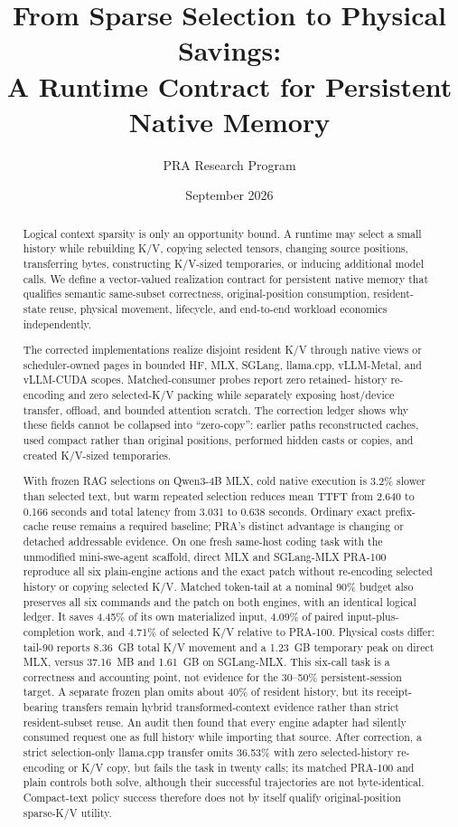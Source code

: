 \documentclass[11pt]{article}
\title{From Sparse Selection to Physical Savings:\\
 A Runtime Contract for Persistent Native Memory}
\author{PRA Research Program}
\date{September 2026}
\begin{document}
\maketitle

\begin{abstract}
Logical context sparsity is only an opportunity bound.  A runtime may select a
small history while rebuilding K/V, copying selected tensors, changing source
positions, transferring bytes, constructing K/V-sized temporaries, or inducing
additional model calls.  We define a vector-valued realization contract for
persistent native memory that qualifies semantic same-subset correctness,
original-position consumption, resident-state reuse, physical movement,
lifecycle, and end-to-end workload economics independently.

The corrected implementations realize disjoint resident K/V through native
views or scheduler-owned pages in bounded HF, MLX, SGLang, llama.cpp,
vLLM-Metal, and vLLM-CUDA scopes.  Matched-consumer probes report zero retained-
history re-encoding and zero selected-K/V packing while separately exposing
host/device transfer, offload, and bounded attention scratch.  The correction
ledger shows why these fields cannot be collapsed into ``zero-copy'': earlier
paths reconstructed caches, used compact rather than original positions,
performed hidden casts or copies, and created K/V-sized temporaries.

With frozen RAG selections on Qwen3-4B MLX, cold native execution is 3.2\%
slower than selected text, but warm repeated selection reduces mean TTFT from
2.640 to 0.166 seconds and total latency from 3.031 to 0.638 seconds.  Ordinary
exact prefix-cache reuse remains a required baseline; PRA's distinct advantage
is changing or detached addressable evidence.  On one fresh same-host coding
task with the unmodified mini-swe-agent scaffold, direct MLX and SGLang-MLX
PRA-100 reproduce all six plain-engine actions and the exact patch without
re-encoding selected history or copying selected K/V.  Matched token-tail at a
nominal 90\% budget also preserves all six commands and the patch on both
engines, with an identical logical ledger.  It saves 4.45\%
of its own materialized input, 4.09\% of paired input-plus-completion work,
and 4.71\% of selected K/V relative to PRA-100.  Physical costs differ:
tail-90 reports 8.36~GB total K/V movement and a 1.23~GB temporary peak on
direct MLX, versus 37.16~MB and 1.61~GB on SGLang-MLX.  This six-call task is a
correctness and accounting point, not evidence
for the 30--50\% persistent-session target.  A separate
frozen plan omits about 40\% of resident
history, but its receipt-bearing transfers remain hybrid transformed-context
evidence rather than strict resident-subset reuse.
An audit then found that every engine adapter had silently consumed request one
as full history while importing that source.  After correction, a strict
selection-only llama.cpp transfer omits 36.53\% with zero selected-history
re-encoding or K/V copy, but fails the task in twenty calls; its matched
PRA-100 and plain controls both solve, although their successful trajectories
are not byte-identical.  Compact-text policy success therefore does not by
itself qualify original-position sparse-K/V utility.


\end{abstract}
\end{document}
